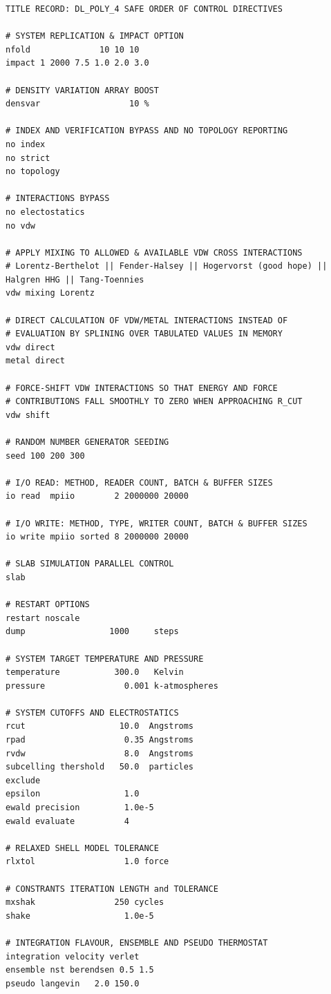 \begin{lstlisting}
TITLE RECORD: DL_POLY_4 SAFE ORDER OF CONTROL DIRECTIVES

# SYSTEM REPLICATION & IMPACT OPTION
nfold              10 10 10
impact 1 2000 7.5 1.0 2.0 3.0

# DENSITY VARIATION ARRAY BOOST
densvar                  10 %

# INDEX AND VERIFICATION BYPASS AND NO TOPOLOGY REPORTING
no index
no strict
no topology

# INTERACTIONS BYPASS
no electostatics
no vdw

# APPLY MIXING TO ALLOWED & AVAILABLE VDW CROSS INTERACTIONS
# Lorentz-Berthelot || Fender-Halsey || Hogervorst (good hope) || Halgren HHG || Tang-Toennies
vdw mixing Lorentz

# DIRECT CALCULATION OF VDW/METAL INTERACTIONS INSTEAD OF
# EVALUATION BY SPLINING OVER TABULATED VALUES IN MEMORY
vdw direct
metal direct

# FORCE-SHIFT VDW INTERACTIONS SO THAT ENERGY AND FORCE
# CONTRIBUTIONS FALL SMOOTHLY TO ZERO WHEN APPROACHING R_CUT
vdw shift

# RANDOM NUMBER GENERATOR SEEDING
seed 100 200 300

# I/O READ: METHOD, READER COUNT, BATCH & BUFFER SIZES
io read  mpiio        2 2000000 20000

# I/O WRITE: METHOD, TYPE, WRITER COUNT, BATCH & BUFFER SIZES
io write mpiio sorted 8 2000000 20000

# SLAB SIMULATION PARALLEL CONTROL
slab

# RESTART OPTIONS
restart noscale
dump                 1000     steps

# SYSTEM TARGET TEMPERATURE AND PRESSURE
temperature           300.0   Kelvin
pressure                0.001 k-atmospheres

# SYSTEM CUTOFFS AND ELECTROSTATICS
rcut                   10.0  Angstroms
rpad                    0.35 Angstroms
rvdw                    8.0  Angstroms
subcelling thershold   50.0  particles
exclude
epsilon                 1.0
ewald precision         1.0e-5
ewald evaluate          4

# RELAXED SHELL MODEL TOLERANCE
rlxtol                  1.0 force

# CONSTRANTS ITERATION LENGTH and TOLERANCE
mxshak                250 cycles
shake                   1.0e-5

# INTEGRATION FLAVOUR, ENSEMBLE AND PSEUDO THERMOSTAT
integration velocity verlet
ensemble nst berendsen 0.5 1.5
pseudo langevin   2.0 150.0


\end{lstlisting}
